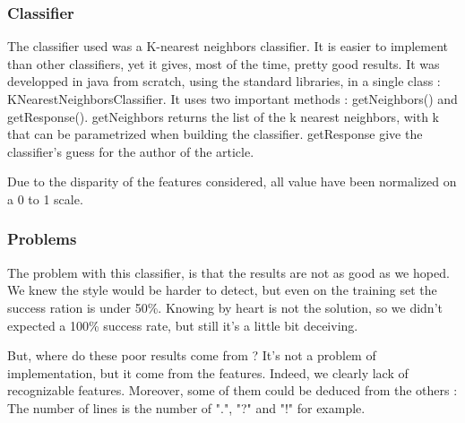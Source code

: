 \label{lab:clas1}
\subsubsection{Classifier}

The classifier used was a K-nearest neighbors classifier. It is easier to implement than other classifiers, yet it gives, most of the time, pretty good results.
It was developped in java from scratch, using the standard libraries, in a single class : KNearestNeighborsClassifier. It uses two important methods : getNeighbors() and getResponse().
getNeighbors returns the list of the k nearest neighbors, with k that can be parametrized when building the classifier.
getResponse give the classifier's guess for the author of the article.

Due to the disparity of the features considered, all value have been normalized on a 0 to 1 scale.


\subsubsection{Problems}
The problem with this classifier, is that the results are not as good as we hoped. We knew the style would be harder to detect, but even on the training set the success ration is under 50\%. Knowing by heart is not the solution, so we didn't expected a 100\% success rate, but still it's a little bit deceiving. 

But, where do these poor results come from ? It's not a problem of implementation, but it come from the features. Indeed, we clearly lack of recognizable features. Moreover, some of them could be deduced from the others : The number of lines is the number of ".", "?" and "!" for example.